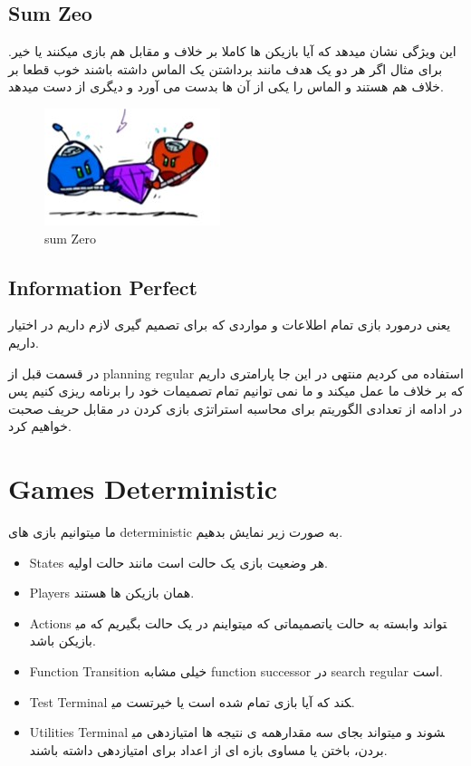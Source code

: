 \subsection{Sum Zeo}
این ویژگی نشان میدهد که آیا بازیکن ها کاملا بر خلاف و مقابل هم بازی میکنند یا خیر. برای مثال اگر هر دو یک هدف مانند برداشتن یک الماس داشته باشند خوب قطعا بر خلاف هم هستند و الماس را یکی از آن ها بدست می آورد و دیگری از دست میدهد.

\begin{figure}[h!]
    \centering
    \includegraphics[width=0.3\linewidth]{images/zerosum.jpg}
    \caption{sum Zero}
\end{figure}


\subsection{Information Perfect}
یعنی درمورد بازی تمام اطلاعات و مواردی که برای تصمیم گیری لازم داریم در اختیار داریم.


در قسمت قبل از planning regular استفاده می کردیم منتهی در این جا پارامتری داریم که بر خلاف ما عمل میکند و ما نمی توانیم تمام تصمیمات خود را برنامه ریزی کنیم پس در ادامه از تعدادی الگوریتم برای محاسبه استراتژی بازی کردن در مقابل حریف صحبت خواهیم کرد.



\section{Games Deterministic}
ما میتوانیم بازی های deterministic به صورت زیر نمایش بدهیم.
\begin{itemize}
    \item
States هر وضعیت بازی یک حالت است مانند حالت اولیه.
    \item
Players همان بازیکن ها هستند.
    \item
Actions تصمیماتی که میتواینم در یک حالت بگیریم که می‎تواند وابسته به حالت یا بازیکن باشد. 
    \item
Function Transition خیلی مشابه function successor در search regular است.
    \item
Test Terminal تست می‎کند که آیا بازی تمام شده است یا خیر.
    \item
 Utilities Terminal همه ی نتیجه ها امتیازدهی می‎شوند و میتواند بجای سه مقدار بردن، باختن یا مساوی بازه ای از اعداد برای امتیازدهی داشته باشند.
 \end{itemize}


